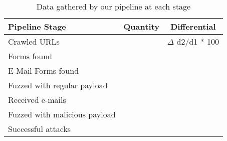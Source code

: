 \begin{table}[tbp]
	\centering
	\scriptsize
	\begin{tabular}{|l|c|c|}
		\hline
		\textbf{Pipeline Stage} & \textbf{Quantity} & \textbf{Differential}\\
		\hline
		Crawled URLs  & \urls & $\Delta$ d2/d1 * 100 \\
		\hline
		Forms found  & \forms & \formsDelta \\
		\hline
		E-Mail Forms found  & \emailforms & \emailformsDelta \\
		\hline
		Fuzzed with regular payload  & \fuzzed & \fuzzedDelta \\
		\hline
		Received e-mails  & \recd & \recdDelta \\
		\hline
		Fuzzed with malicious payload  & \malfuzzed & \malfuzzedDelta \\
		\hline
		Successful attacks  & \success & \successDelta \\
		\hline

	\end{tabular}
	\caption[]{Data gathered
      by our pipeline at each stage}
    \vspace{-5ex}
	\label{tab:pipeline}
\end{table}
